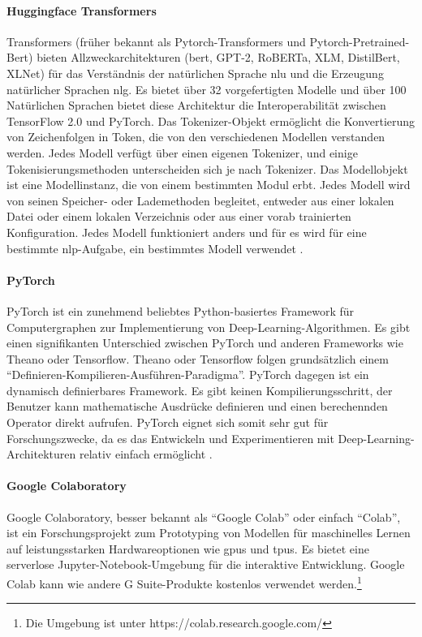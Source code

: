 \documentclass[
        ngerman,
        paper=a4,
        numbers=noendperiod,
]{scrreprt}
\begin{document}
\paragraph{Huggingface Transformers}
Transformers (früher bekannt als Pytorch-Transformers und Pytorch-Pretrained-Bert) bieten Allzweckarchitekturen (\ac{bert}, GPT-2, RoBERTa, XLM, DistilBert, XLNet) für das Verständnis der natürlichen Sprache \ac{nlu} und die Erzeugung natürlicher Sprachen \ac{nlg}. Es bietet über 32 vorgefertigten Modelle und über 100 Natürlichen Sprachen bietet diese Architektur die Interoperabilität zwischen TensorFlow 2.0 und PyTorch. Das Tokenizer-Objekt ermöglicht die Konvertierung von Zeichenfolgen in Token, die von den verschiedenen Modellen verstanden werden. Jedes Modell verfügt über einen eigenen Tokenizer, und einige Tokenisierungsmethoden unterscheiden sich je nach Tokenizer. Das Modellobjekt ist eine Modellinstanz, die von einem bestimmten Modul erbt. Jedes Modell wird von seinen Speicher- oder Lademethoden begleitet, entweder aus einer lokalen Datei oder einem lokalen Verzeichnis oder aus einer vorab trainierten Konfiguration. Jedes Modell funktioniert anders und für es wird für eine bestimmte \ac{nlp}-Aufgabe, ein bestimmtes Modell verwendet \citep{TransformersDocumentation}\citep{PyTorch-TransformersPyTorch}.

\paragraph{PyTorch}
PyTorch ist ein zunehmend beliebtes Python-basiertes Framework für Computergraphen zur Implementierung von Deep-Learning-Algorithmen. Es gibt einen signifikanten Unterschied zwischen PyTorch und anderen Frameworks wie Theano oder Tensorflow. Theano oder Tensorflow folgen grundsätzlich einem \enquote{Definieren-Kompilieren-Ausführen-Paradigma}. PyTorch dagegen ist ein dynamisch definierbares Framework. Es gibt keinen Kompilierungsschritt, der Benutzer kann mathematische Ausdrücke definieren und einen berechennden Operator direkt aufrufen. PyTorch eignet sich somit sehr gut für Forschungszwecke, da es das Entwickeln und Experimentieren mit Deep-Learning-Architekturen relativ einfach ermöglicht \citep[S. 195]{Ketkar2017}.

\paragraph{Google Colaboratory}
Google Colaboratory, besser bekannt als \enquote{Google Colab} oder einfach \enquote{Colab}, ist ein Forschungsprojekt zum Prototyping von Modellen für maschinelles Lernen auf leistungsstarken Hardwareoptionen wie \ac{gpu}s und \ac{tpu}s. Es bietet eine serverlose Jupyter-Notebook-Umgebung für die interaktive Entwicklung. Google Colab kann wie andere G Suite-Produkte kostenlos verwendet werden.\footnote{Die Umgebung ist unter https://colab.research.google.com/}
\end{document}
